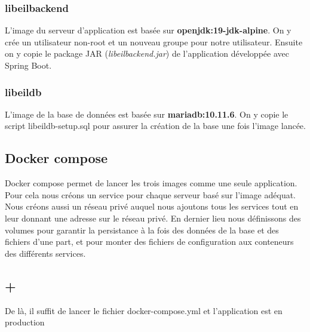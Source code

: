 \subsubsection{libeilbackend}
L'image du serveur d'application est bas\'ee sur \textbf{openjdk:19-jdk-alpine}. On y cr\'ee un utilisateur non-root et un nouveau groupe pour notre utilisateur. Ensuite on y copie le package JAR (\textit{libeilbackend.jar}) de l'application d\'evelopp\'ee avec Spring Boot.

\subsubsection{libeildb}
L'image de la base de donn\'ees est bas\'ee sur \textbf{mariadb:10.11.6}. On y copie le script libeildb-setup.sql pour assurer la cr\'eation de la base une fois l'image lanc\'ee.

\subsection{Docker compose}
Docker compose permet de lancer les trois images comme une seule application. Pour cela nous cr\'eons un service pour chaque serveur bas\'e sur l'image ad\'equat. Nous cr\'eons aussi un r\'eseau priv\'e auquel nous ajoutons tous les services tout en leur donnant une adresse sur le r\'eseau priv\'e. En dernier lieu nous d\'efinissons des volumes pour garantir la persistance \`a la fois des donn\'ees de la base et des fichiers d'une part, et pour monter des fichiers de configuration aux conteneurs des diff\'erents services.\\

\subsection{+}
De l\`a, il suffit de lancer le fichier docker-compose.yml et l'application est en production



